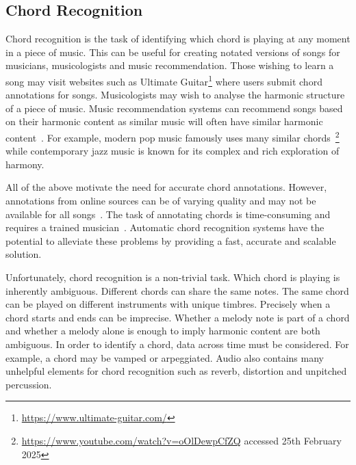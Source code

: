 \subsection{Chord Recognition}

Chord recognition is the task of identifying which chord is playing at any moment in a piece of music. This can be useful for creating notated versions of songs for musicians, musicologists and music recommendation. Those wishing to learn a song may visit websites such as Ultimate Guitar\footnote{\url{https://www.ultimate-guitar.com/}} where users submit chord annotations for songs. Musicologists may wish to analyse the harmonic structure of a piece of music. Music recommendation systems can recommend songs based on their harmonic content as similar music will often have similar harmonic content~\citep{MusicGenreClassification}. For example, modern pop music famously uses many similar chords~\footnote{\url{https://www.youtube.com/watch?v=oOlDewpCfZQ} accessed 25th February 2025} while contemporary jazz music is known for its complex and rich exploration of harmony.

All of the above motivate the need for accurate chord annotations. However, annotations from online sources can be of varying quality and may not be available for all songs~\citep{Choco}. The task of annotating chords is time-consuming and requires a trained musician~\citep{McgillBillboard}. Automatic chord recognition systems have the potential to alleviate these problems by providing a fast, accurate and scalable solution.

Unfortunately, chord recognition is a non-trivial task. Which chord is playing is inherently ambiguous. Different chords can share the same notes. The same chord can be played on different instruments with unique timbres. Precisely when a chord starts and ends can be imprecise. Whether a melody note is part of a chord and whether a melody alone is enough to imply harmonic content are both ambiguous. In order to identify a chord, data across time must be considered. For example, a chord may be vamped or arpeggiated. Audio also contains many unhelpful elements for chord recognition such as reverb, distortion and unpitched percussion.


